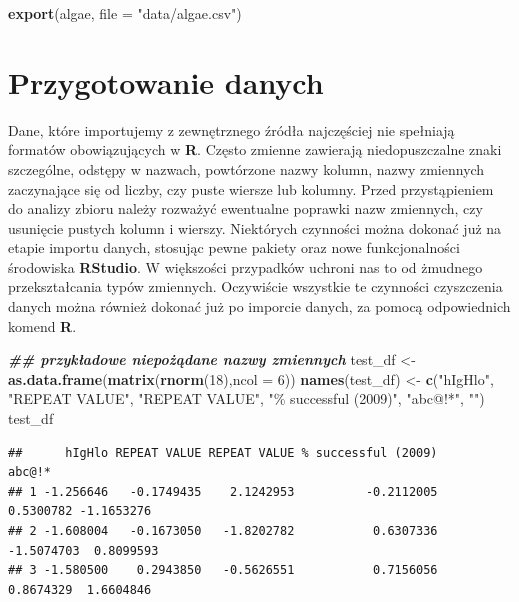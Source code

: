 \documentclass[
]{book}
\newenvironment{Shaded}{\begin{snugshade}}{\end{snugshade}}
\newcommand{\AttributeTok}[1]{\textcolor[rgb]{0.13,0.29,0.53}{#1}}
\newcommand{\DecValTok}[1]{\textcolor[rgb]{0.00,0.00,0.81}{#1}}
\newcommand{\DocumentationTok}[1]{\textcolor[rgb]{0.56,0.35,0.01}{\textbf{\textit{#1}}}}
\newcommand{\FunctionTok}[1]{\textcolor[rgb]{0.13,0.29,0.53}{\textbf{#1}}}
\newcommand{\NormalTok}[1]{#1}
\newcommand{\OtherTok}[1]{\textcolor[rgb]{0.56,0.35,0.01}{#1}}
\newcommand{\StringTok}[1]{\textcolor[rgb]{0.31,0.60,0.02}{#1}}
\theoremstyle{plain}
\theoremstyle{definition}
\theoremstyle{definition}
\theoremstyle{definition}
\theoremstyle{definition}
\theoremstyle{definition}
\theoremstyle{remark}
\begin{document}
\begin{Shaded}
\begin{Highlighting}[]
\FunctionTok{export}\NormalTok{(algae, }\AttributeTok{file =} \StringTok{"data/algae.csv"}\NormalTok{)}
\end{Highlighting}
\end{Shaded}

\chapter{Przygotowanie danych}\label{przygotowanie-danych}

Dane, które importujemy z zewnętrznego źródła najczęściej nie spełniają formatów obowiązujących w \textbf{R}. Często zmienne zawierają niedopuszczalne znaki szczególne, odstępy w nazwach, powtórzone nazwy kolumn, nazwy zmiennych zaczynające się od liczby, czy puste wiersze lub kolumny. Przed przystąpieniem do analizy zbioru należy rozważyć ewentualne poprawki nazw zmiennych, czy usunięcie pustych kolumn i wierszy. Niektórych czynności można dokonać już na etapie importu danych, stosując pewne pakiety oraz nowe funkcjonalności środowiska \textbf{RStudio}. W większości przypadków uchroni nas to od żmudnego przekształcania typów zmiennych. Oczywiście wszystkie te czynności czyszczenia danych można również dokonać już po imporcie danych, za pomocą odpowiednich komend \textbf{R}.

\begin{Shaded}
\begin{Highlighting}[]
\DocumentationTok{\#\# przykładowe niepożądane nazwy zmiennych}
\NormalTok{test\_df }\OtherTok{\textless{}{-}} \FunctionTok{as.data.frame}\NormalTok{(}\FunctionTok{matrix}\NormalTok{(}\FunctionTok{rnorm}\NormalTok{(}\DecValTok{18}\NormalTok{),}\AttributeTok{ncol =} \DecValTok{6}\NormalTok{))}
\FunctionTok{names}\NormalTok{(test\_df) }\OtherTok{\textless{}{-}} \FunctionTok{c}\NormalTok{(}\StringTok{"hIgHlo"}\NormalTok{, }\StringTok{"REPEAT VALUE"}\NormalTok{, }\StringTok{"REPEAT VALUE"}\NormalTok{,}
                    \StringTok{"\% successful (2009)"}\NormalTok{,  }\StringTok{"abc@!*"}\NormalTok{, }\StringTok{""}\NormalTok{)}
\NormalTok{test\_df}
\end{Highlighting}
\end{Shaded}

\begin{verbatim}
##      hIgHlo REPEAT VALUE REPEAT VALUE % successful (2009)     abc@!*           
## 1 -1.256646   -0.1749435    2.1242953          -0.2112005  0.5300782 -1.1653276
## 2 -1.608004   -0.1673050   -1.8202782           0.6307336 -1.5074703  0.8099593
## 3 -1.580500    0.2943850   -0.5626551           0.7156056  0.8674329  1.6604846
\end{verbatim}
\end{document}
